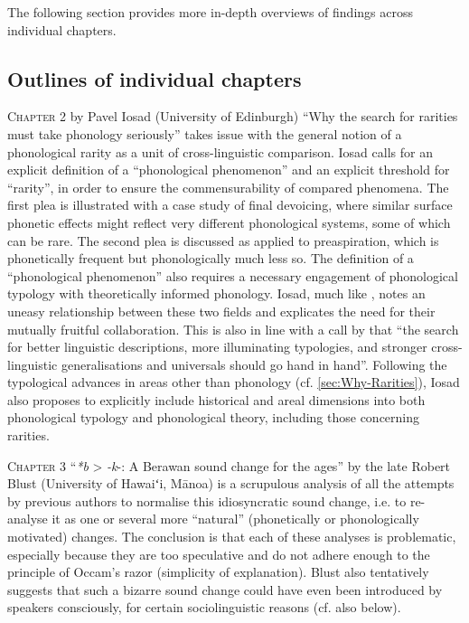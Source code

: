\documentclass[output=paper]{langscibook}
\begin{document}
The following section provides more in-depth overviews of findings across individual chapters.

\subsection{Outlines of individual chapters}
\label{sec:Content-Volume}
\textsc{Chapter 2} by Pavel Iosad (University of Edinburgh) “Why the search for rarities must take phonology seriously” takes issue with the general notion of a phonological rarity as a unit of cross-linguistic comparison. Iosad calls for an explicit definition of a “phonological phenomenon” and an explicit threshold for “rarity”, in order to ensure the commensurability of compared phenomena. The first plea is illustrated with a case study of final devoicing, where similar surface phonetic effects might reflect very different phonological systems, some of which can be rare. The second plea is discussed as applied to preaspiration, which is phonetically frequent but phonologically much less so. The definition of a “phonological phenomenon” also requires a necessary engagement of phonological typology with theoretically informed phonology. Iosad, much like \citet{HymanPlank2018}, notes an uneasy relationship between these two fields and explicates the need for their mutually fruitful collaboration. This is also in line with a call by \citet[97]{Kiparsky2018} that “the search for better linguistic descriptions, more illuminating typologies, and stronger cross-linguistic generalisations and universals should go hand in hand”. Following the typological advances in areas other than phonology (cf. \cref{sec:Why-Rarities}), Iosad also proposes to explicitly include historical and areal dimensions into both phonological typology and phonological theory, including those concerning rarities.

\textsc{Chapter 3} “\textit{*b} > \textit{-k}{}-: A Berawan sound change for the ages” by the late Robert Blust (University of Hawaiʻi, Mānoa) is a scrupulous analysis of all the attempts by previous authors to normalise this idiosyncratic sound change, i.e. to re-ana\-lyse it as one or several more “natural” (phonetically or phonologically motivated) changes. The conclusion is that each of these analyses is problematic, especially because they are too speculative and do not adhere enough to the principle of Occam’s razor (simplicity of explanation). Blust also tentatively suggests that such a bizarre sound change could have even been introduced by speakers consciously, for certain sociolinguistic reasons (cf. also  below).
\end{document}
